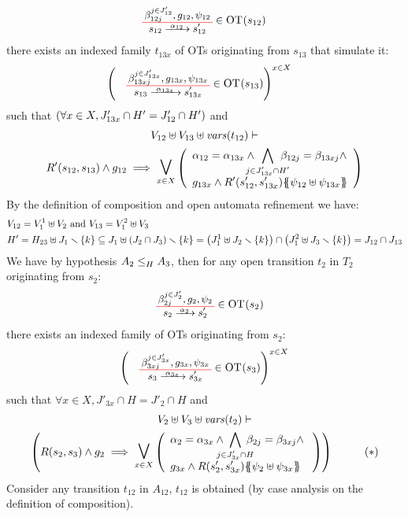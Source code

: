 \documentclass[runningheads]{llncs}
\begin{document}
\begin{enumerate}
\begin{align*}
		&  \OTx{12}{}{12}{12} \in \fOT{s_{12}}
\end{align*}		
there exists an indexed family $t_{13x}$ of OTs originating from $s_{13}$ that simulate it: 
\begin{align*}
		&  \mpar{\OTx{13}{x}{13x}{13x} \in \fOT{s_{13}}}^{x \in X}
\end{align*}	
such that  $\mpar{\forall x \in X, J'_{13x} \cap H' = J'_{12} \cap H'}$ and
\begin{multline*}	
V_{12} \uplus V_{13} \uplus \fvars{t_{12}} \vdash\\ R'\mpar{s_{12}, s_{13}} \wedge g_{12} \implies \operatorname*{\bigsymb{\bigvee}}_{x \in X} \mpar{\everymath{\displaystyle}\begin{array}{l}
			\alpha_{12} = \alpha_{13x} \wedge \bigwedge_\subbox{j \in J'_{13x} \cap H'} \beta_{12j} = \beta_{13xj} \wedge\\[12pt]
			 g_{13x} \wedge R'\mpar{s'_{12}, s'_{13x}}\psubst{\psi_{12} \uplus \psi_{13x}}
		\end{array}} 
	\end{multline*}
By the definition of composition and open automata refinement we have: 
\begin{align*}
&V_{12}= V^1_1\uplus V_2 \text{ and }
V_{13}= V^2_1\uplus V_3\\
& H'=H_{23}\uplus J_1 \setminus \{k\} \subseteq J_1\uplus \mpar{J_2 \cap J_3} \setminus \{k\} = \mpar{J^1_1\uplus J_2 \setminus \{k\} } \cap \mpar{J^2_1\uplus J_3 \setminus \{k\}} = J_{12 } \cap J_{13} \\
\end{align*}
We have by hypothesis $\wrel{A_2}{A_3}{H}$, then for any open transition $t_2$ in $T_2$  originating from $s_2$:
\begin{align*}
\OTx{2}{}{2}{2} \in \fOT{s_2}
\end{align*}
there exists an indexed family of OTs originating from $s_{2}$: 
\begin{align*}
\mpar{\OTx{3}{x}{3x}{3x} \in \fOT{s_{3}}}^{x \in X} 
\end{align*}
such that $\forall x \in X, J'_{3x} \cap H = J'_2 \cap H$ and
\begin{multline*}
V_2 \uplus V_3 \uplus \fvars{t_2} \vdash\\ \mpar{R\mpar{s_2, s_3} \wedge g_2 \implies \operatorname*{\bigsymb{\bigvee}}_{x \in X} \mpar{\everymath{\displaystyle}
\begin{array}{l}
			\alpha_2 = \alpha_{3x} \wedge \bigwedge_\subbox{j \in J'_{3x} \cap H} \beta_{2j} = \beta_{3xj} \nwedge\\
			 g_{3x} \wedge R\mpar{s'_2, s'_{3x}}\psubst{\psi_2 \uplus \psi_{3x}}
		\end{array}}}  \qquad \quad (*)
\end{multline*}	
\smallskip
Consider any transition $t_{12}$ in $A_{12}$,  $t_{12}$ is obtained (by case analysis on the definition of composition).  
 

\end{enumerate}
\end{document}
